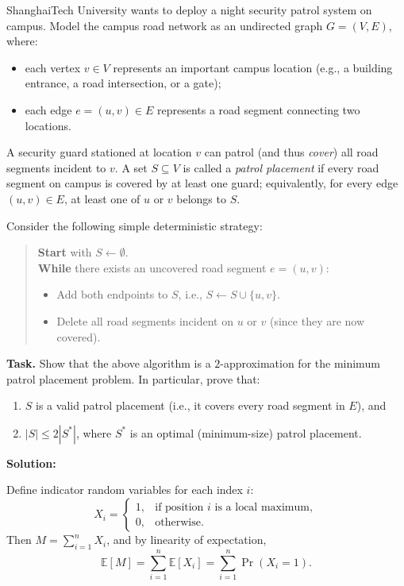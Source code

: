 \problem{}

ShanghaiTech University wants to deploy a night security patrol system on campus. 
Model the campus road network as an undirected graph $G=(V,E)$, where:
\begin{itemize}
    \item each vertex $v \in V$ represents an important campus location (e.g., a building entrance, a road intersection, or a gate);
    \item each edge $e=(u,v)\in E$ represents a road segment connecting two locations.
\end{itemize}
A security guard stationed at location $v$ can patrol (and thus \emph{cover}) all road segments incident to $v$. 
A set $S \subseteq V$ is called a \emph{patrol placement} if every road segment on campus is covered by at least one guard; 
equivalently, for every edge $(u,v)\in E$, at least one of $u$ or $v$ belongs to $S$.

\medskip
Consider the following simple deterministic strategy:
\begin{quote}
\textbf{Start} with $S \leftarrow \emptyset$. \\
\textbf{While} there exists an uncovered road segment $e=(u,v)$:
\begin{itemize}
    \item Add both endpoints to $S$, i.e., $S \leftarrow S \cup \{u,v\}$.
    \item Delete all road segments incident on $u$ or $v$ (since they are now covered).
\end{itemize}
\end{quote}

\noindent \textbf{Task.} 
Show that the above algorithm is a $2$-approximation for the minimum patrol placement problem.
In particular, prove that:
\begin{enumerate}
    \item $S$ is a valid patrol placement (i.e., it covers every road segment in $E$), and
    \item $|S| \le 2|S^*|$, where $S^*$ is an optimal (minimum-size) patrol placement.
\end{enumerate}

\noindent \textbf{Solution:}



Define indicator random variables for each index \(i\):
\[
X_i = \begin{cases}
1, & \text{if position } i \text{ is a local maximum},\\
0, & \text{otherwise}.
\end{cases}
\]
Then \(M = \sum_{i=1}^n X_i\), and by linearity of expectation,
\[
\mathbb{E}[M] = \sum_{i=1}^n \mathbb{E}[X_i] = \sum_{i=1}^n \Pr(X_i = 1).
\]

